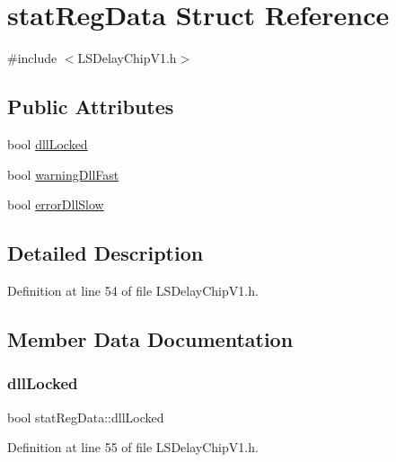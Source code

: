 \hypertarget{structstatRegData}{}\section{stat\+Reg\+Data Struct Reference}
\label{structstatRegData}


{\ttfamily \#include $<$L\+S\+Delay\+Chip\+V1.\+h$>$}

\subsection*{Public Attributes}
\begin{DoxyCompactItemize}
\item 
bool \hyperlink{structstatRegData_acde4a715190d913538708ed40eb5d7b3}{dll\+Locked}
\item 
bool \hyperlink{structstatRegData_ab2c309fd8e307f289133e11a72d54dc2}{warning\+Dll\+Fast}
\item 
bool \hyperlink{structstatRegData_aef4d8d8abc4ce09fe4513a491718cf78}{error\+Dll\+Slow}
\end{DoxyCompactItemize}


\subsection{Detailed Description}


Definition at line 54 of file L\+S\+Delay\+Chip\+V1.\+h.



\subsection{Member Data Documentation}
\mbox{\label{structstatRegData_acde4a715190d913538708ed40eb5d7b3}} 
\subsubsection{\texorpdfstring{dll\+Locked}{dllLocked}}
{\footnotesize\ttfamily bool stat\+Reg\+Data\+::dll\+Locked}



Definition at line 55 of file L\+S\+Delay\+Chip\+V1.\+h.

\mbox{\label{structstatRegData_aef4d8d8abc4ce09fe4513a491718cf78}} 
